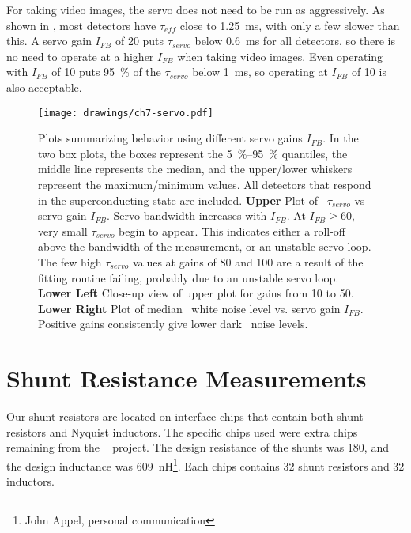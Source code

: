 For taking video images, the servo does not need to be run as aggressively.
As shown in , most detectors have $\tau_{eff}$ close to \SI{1.25}{\ms}, with only a few slower than this.
A servo gain $I_{FB}$ of 20 puts $\tau_{servo}$ below \SI{0.6}{\ms} for all detectors, so there is no need to operate at a higher $I_{FB}$ when taking video images.
Even operating with $I_{FB}$ of 10 puts \SI{95}{\percent} of the $\tau_{servo}$ below \SI{1}{\ms}, so operating at $I_{FB}$ of 10 is also acceptable.

\begin{figure*}
\texttt{[image: drawings/ch7-servo.pdf]}
\caption[Plots summarizing behavior using different servo gains $I_{FB}$]{
  Plots summarizing behavior using different servo gains $I_{FB}$.
  In the two box plots, the boxes represent the \SIrange{5}{95}{\percent} quantiles, the middle line represents the median, and the upper/lower whiskers represent the maximum/minimum values.
All detectors that respond in the superconducting state are included.
\textbf{Upper} Plot of \SQUID\ $\tau_{servo}$ vs servo gain $I_{FB}$.
Servo bandwidth increases with $I_{FB}$.
At $I_{FB} \ge \num{60}$, very small $\tau_{servo}$ begin to appear. This indicates either a roll-off above the bandwidth of the measurement, or an unstable servo loop.
The few high $\tau_{servo}$ values at gains of 80 and 100 are a result of the fitting routine failing, probably due to an unstable servo loop.
\textbf{Lower Left} Close-up view of upper plot for gains from 10 to 50.
\textbf{Lower Right} Plot of median \SQUID\ white noise level vs. servo gain $I_{FB}$. Positive gains consistently give lower dark \SQUID\ noise levels.
}
\label{fig:ch7-servo}
\end{figure*}

\section{Shunt Resistance Measurements}\label{sec:shunt-nyquist}

Our shunt resistors are located on interface chips that contain both shunt resistors and Nyquist inductors.
The specific chips used were extra chips remaining from the \ABS\ \cite{kusaka_modulation_2013} project.
The design resistance of the shunts was \SI{180}{\uohm}, and the design inductance was 609~nH\footnote{John Appel, personal communication}.
Each chips contains 32 shunt resistors and 32 inductors.

